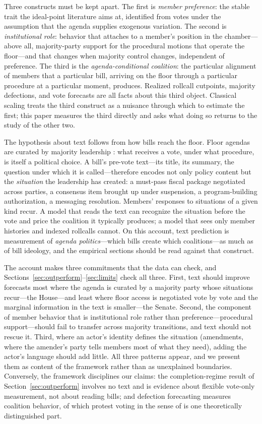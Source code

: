 \documentclass[12pt]{article}
\begin{document}
Three constructs must be kept apart. The first is \emph{member
preference}: the stable trait the ideal-point literature aims at,
identified from votes under the assumption that the agenda supplies
exogenous variation. The second is \emph{institutional role}: behavior
that attaches to a member's position in the chamber---above all,
majority-party support for the procedural motions that operate the
floor---and that changes when majority control changes, independent of
preference. The third is the \emph{agenda-conditional coalition}: the
particular alignment of members that a particular bill, arriving on
the floor through a particular procedure at a particular moment,
produces. Realized rollcall cutpoints, majority defections, and vote
forecasts are all facts about this third object. Classical scaling
treats the third construct as a nuisance through which to estimate
the first; this paper measures the third directly and asks what doing
so returns to the study of the other two.

The hypothesis about text follows from how bills reach the floor.
Floor agendas are curated by majority leadership
\citep{cox2005setting}: what receives a vote, under what procedure,
is itself a political choice. A bill's pre-vote text---its title,
its summary, the question under which it is called---therefore
encodes not only policy content but the \emph{situation} the
leadership has created: a must-pass fiscal package negotiated across
parties, a consensus item brought up under suspension, a
program-building authorization, a messaging resolution. Members'
responses to situations of a given kind recur. A model that reads the
text can recognize the situation before the vote and price the
coalition it typically produces; a model that sees only member
histories and indexed rollcalls cannot. On this account, text
prediction is measurement of \emph{agenda politics}---which bills
create which coalitions---as much as of bill ideology, and the
empirical sections should be read against that construct.

The account makes three commitments that the data can check, and
Sections~\ref{sec:outperform}--\ref{sec:limits} check all three.
First, text should improve forecasts most where the agenda is curated
by a majority party whose situations recur---the House---and least
where floor access is negotiated vote by vote and the marginal
information in the text is smaller---the Senate. Second, the
component of member behavior that is institutional role rather than
preference---procedural support---should fail to transfer across
majority transitions, and text should not rescue it. Third, where an
actor's identity defines the situation (amendments, where the
amender's party tells members most of what they need), adding the
actor's language should add little. All three patterns appear, and we
present them as content of the framework rather than as unexplained
boundaries. Conversely, the framework disciplines our claims: the
completion-regime result of Section~\ref{sec:outperform} involves no
text and is evidence about flexible vote-only measurement, not about
reading bills; and defection forecasting measures coalition behavior,
of which protest voting in the sense of \citet{fowler2026protest} is
one theoretically distinguished part.
\end{document}
